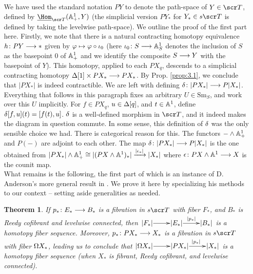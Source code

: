 \documentclass{amsart}
\newtheorem{thm}{Theorem}[section]
\theoremstyle{definition}
\begin{document}
\noindent We have used the standard notation $PY$ to denote the path-space of $Y \in \sT$, defined by $\underline{\Hom}_{\sT} (\bA^1_+, Y)$ (the simplicial version $PY_*$ for $Y_* \in s\sT$ is defined by taking the levelwise path-space). We outline the proof of the first part here. Firstly, we note that there is a natural contracting homotopy equivalence $h \colon PY \longrightarrow *$ given by $\varphi \mapsto \varphi \circ \iota_0$ (here $\iota_0 \colon S \longrightarrow \mathbb{A}^1_S$ denotes the inclusion of $S$ as the basepoint 0 of $\mathbb{A}^1_+$ and we identify the composite $S \longrightarrow Y$ with the basepoint of $Y$). This homotopy, applied to each $PX_q$, descends to a simplicial contracting homotopy $\Delta[1] \times PX_* \longrightarrow PX_*$. By Prop. \ref{prop:3.1}, we conclude that $|PX_*|$ is indeed contractible. We are left with defining $\delta \colon |PX_*| \longrightarrow P|X_*|$. Everything that follows in this paragraph fixes an arbitrary $U \in \mathrm{Sm}_S$, and work over this $U$ implicitly. For $f \in PX_q$, $u \in \Delta[q]$, and $t \in \mathbb{A}^1$, define $\delta[f,u](t)=[f(t),u]$. $\delta$ is a well-defined morphism in $\sT$, and it indeed makes the diagram in question commute. In some sense, this definition of $\delta$ was the only sensible choice we had. There is categorical reason for this. The functors $- \wedge \mathbb{A}^1_+$ and $P(-)$ are adjoint to each other. The map $\delta \colon |PX_*| \longrightarrow P|X_*|$ is the one obtained from $|PX_*| \wedge \mathbb{A}^1_+ \cong |(PX \wedge \mathbb{A}^1)_*| \xrightarrow{|\epsilon_*|} |X_*|$ where $\epsilon \colon PX \wedge \mathbb{A}^1 \longrightarrow X$ is the counit map.\\

What remains is the following, the first part of which is an instance of D. Anderson's more general result in \cite{anderson78fib}. We prove it here by specializing his methods to our context -- setting aside generalities as needed.

\begin{thm}\label{thm:3.2and}
If $p_* \colon E_* \longrightarrow B_*$ is a fibration in $s\sT$ with fiber $F_*$, and $B_*$ is Reedy cofibrant and levelwise connected, then $\xymatrix@1{|F_*| \ar[r] & |E_*| \ar[r]^{|p_*|} & |B_*|}$ is a homotopy fiber sequence. Moreover, $p_* \colon PX_* \longrightarrow X_*$ is a fibration in $s\sT$ with fiber $\Omega X_*$, leading us to conclude that $\xymatrix@1{|\OM X_*| \ar[r] & |PX_*| \ar[r]^{|p_*|} & |X_*|}$ is a homotopy fiber sequence (when $X_*$ is fibrant, Reedy cofibrant, and levelwise connected).
\end{thm}
\end{document}
